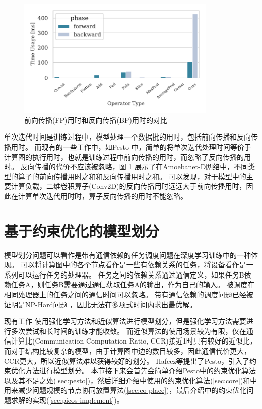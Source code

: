 \begin{figure}[h]
	\centering
	\includegraphics[width=0.85\textwidth]{./figure/4-alg/fp_bp.pdf}
	\caption{前向传播(FP)用时和反向传播(BP)用时的对比}
	\label{fig:fp-vs-bp}
\end{figure}

单次迭代时间是训练过程中，模型处理一个数据批的用时，包括前向传播和反向传播用时。
而现有的一些工作中，如Pesto  中，简单的将单次迭代处理时间等价于计算图的执行用时，也就是训练过程中前向传播的用时，而忽略了反向传播的用时。
反向传播的代价不应该被忽略，图 \ref{fig:fp-vs-bp} 展示了在Amoebanet-D网络中，不同类型的算子的前向传播用时之和和反向传播用时之和。
可以发现，对于模型中的主要计算负载，二维卷积算子(Conv2D)的反向传播用时远远大于前向传播用时，因此在计算单次迭代用时时，算子反向传播的用时不能忽略。


\section{基于约束优化的模型划分}
\label{sec:algorithm}
模型划分问题可以看作是带有通信依赖的任务调度问题在深度学习训练中的一种体现。
可以将计算图中的各个节点看作是一些有依赖关系的任务，将设备看作是一系列可以运行任务的处理器。
任务之间的依赖关系通过通信定义，如果任务B依赖任务A，则任务B需要通过通信获取任务A的输出，作为自己的输入。
被调度在相同处理器上的任务之间的通信时间可以忽略。
带有通信依赖的调度问题已经被证明是NP-Hard问题 ，因此无法在多项式时间内求出最优解。

现有工作  使用强化学习方法和近似算法进行模型划分，但是强化学习方法需要进行多次尝试和长时间的训练才能收敛。
而近似算法的使用场景较为有限，仅在通信计算比(Communication Computation Ratio, CCR)接近1时具有较好的近似比，而对于结构比较复杂的模型，由于计算图中边的数目较多，因此通信代价更大，CCR更大，所以近似算法难以获得较好的划分。
Hafeez等提出了Pesto，引入了约束优化方法进行模型划分。
本节接下来会首先会简单介绍Pesto中的约束优化算法以及其不足之处(\ref{sec:pesto})，然后详细介绍\sys{}中使用的约束优化算法(\ref{sec:core})和\sys{}中用来减少问题规模的节点协同放置算法(\ref{sec:co-place})，最后介绍\sys{}中的约束优化问题求解的实现(\ref{sec:picos-implement})。



